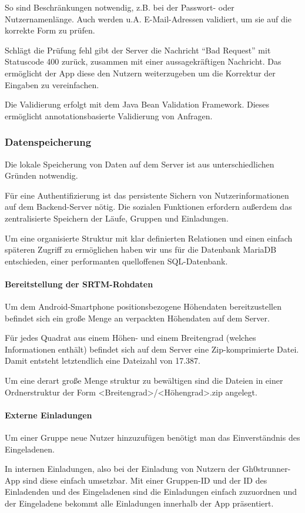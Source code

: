 So sind Beschränkungen notwendig, z.B. bei der Passwort- oder Nutzernamenlänge. Auch werden u.A. E-Mail-Adressen validiert, um sie auf die korrekte Form zu prüfen.

Schlägt die Prüfung fehl gibt der Server die Nachricht ``Bad Request'' mit Statuscode 400 zurück, zusammen mit einer aussagekräftigen Nachricht. Das ermöglicht der App diese den Nutzern weiterzugeben um die Korrektur der Eingaben zu vereinfachen.

Die Validierung erfolgt mit dem Java Bean Validation Framework. Dieses ermöglicht annotationsbasierte Validierung von Anfragen.
\subsubsection{Datenspeicherung}
Die lokale Speicherung von Daten auf dem Server ist aus unterschiedlichen Gründen notwendig.

Für eine Authentifizierung ist das persistente Sichern von Nutzerinformationen auf dem Backend-Server nötig. Die sozialen Funktionen erfordern außerdem das zentralisierte Speichern der Läufe, Gruppen und Einladungen.

Um eine organisierte Struktur mit klar definierten Relationen und einen einfach späteren Zugriff zu ermöglichen haben wir uns für die Datenbank MariaDB entschieden, einer performanten quelloffenen SQL-Datenbank.
\paragraph{Bereitstellung der SRTM-Rohdaten}
Um dem Android-Smartphone positionsbezogene Höhendaten bereitzustellen befindet sich ein große Menge an verpackten Höhendaten auf dem Server.

Für jedes Quadrat aus einem Höhen- und einem Breitengrad (welches Informationen enthält) befindet sich auf dem Server eine Zip-komprimierte Datei. Damit entsteht letztendlich eine Dateizahl von 17.387.

Um eine derart große Menge struktur zu bewältigen sind die Dateien in einer Ordnerstruktur der Form <Breitengrad>/<Höhengrad>.zip angelegt.
\paragraph{Externe Einladungen}
Um einer Gruppe neue Nutzer hinzuzufügen benötigt man das Einverständnis des Eingeladenen.

In internen Einladungen, also bei der Einladung von Nutzern der Gh0strunner-App sind diese einfach umsetzbar. Mit einer Gruppen-ID und der ID des Einladenden und des Eingeladenen sind die Einladungen einfach zuzuordnen und der Eingeladene bekommt alle Einladungen innerhalb der App präsentiert.

